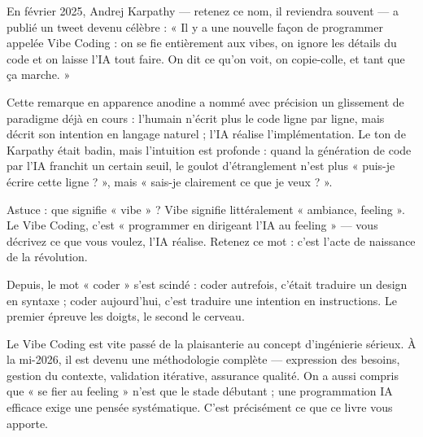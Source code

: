 


En février 2025, Andrej Karpathy — retenez ce nom, il reviendra souvent — a publié un tweet devenu célèbre : « Il y a une nouvelle façon de programmer appelée Vibe Coding : on se fie entièrement aux vibes, on ignore les détails du code et on laisse l'IA tout faire. On dit ce qu'on voit, on copie-colle, et tant que ça marche. »

Cette remarque en apparence anodine a nommé avec précision un glissement de paradigme déjà en cours : l'humain n'écrit plus le code ligne par ligne, mais décrit son intention en langage naturel ; l'IA réalise l'implémentation. Le ton de Karpathy était badin, mais l'intuition est profonde : quand la génération de code par l'IA franchit un certain seuil, le goulot d'étranglement n'est plus « puis-je écrire cette ligne ? », mais « sais-je clairement ce que je veux ? ».

\begin{tcbinfo}{Astuce : que signifie « vibe » ?}
Vibe signifie littéralement « ambiance, feeling ». Le Vibe Coding, c'est « programmer en dirigeant l'IA au feeling » — vous décrivez ce que vous voulez, l'IA réalise. Retenez ce mot : c'est l'acte de naissance de la révolution.

\end{tcbinfo}

Depuis, le mot « coder » s'est scindé : coder autrefois, c'était traduire un design en syntaxe ; coder aujourd'hui, c'est traduire une intention en instructions. Le premier épreuve les doigts, le second le cerveau.

Le Vibe Coding est vite passé de la plaisanterie au concept d'ingénierie sérieux. À la mi-2026, il est devenu une méthodologie complète — expression des besoins, gestion du contexte, validation itérative, assurance qualité. On a aussi compris que « se fier au feeling » n'est que le stade débutant ; une programmation IA efficace exige une pensée systématique. C'est précisément ce que ce livre vous apporte.


